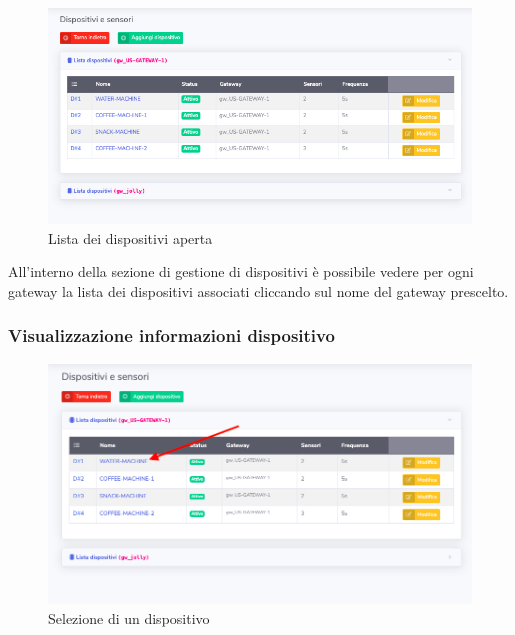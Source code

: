 	\begin{figure}[H]
		\centering
		\includegraphics[scale=0.600]{res/images/admin/listaDispOpen.png}
		\caption{Lista dei dispositivi aperta}
	\end{figure}

		All'interno della sezione di gestione di dispositivi è possibile vedere per ogni gateway la lista dei dispositivi associati cliccando sul nome del gateway prescelto. 

	\subsubsection{Visualizzazione informazioni dispositivo}

		\begin{figure}[H]
		\centering
		\includegraphics[scale=0.480]{res/images/admin/selDetDisp.png}
		\caption{Selezione di un dispositivo}
	\end{figure}


